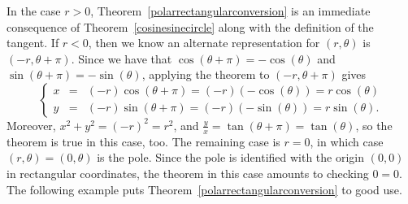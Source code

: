 In the case $r > 0$, Theorem~\ref{polarrectangularconversion} is an immediate consequence of Theorem~\ref{cosinesinecircle} along with the definition of the tangent. If $r < 0$, then we know an alternate representation for $(r,\theta)$ is $(-r, \theta + \pi)$. Since we have that  $\cos(\theta+\pi) = -\cos(\theta)$ and $\sin(\theta + \pi) = -\sin(\theta)$, applying the theorem to $(-r,\theta+\pi)$ gives 
$$
\left\{\begin{array}{rcl}
x &=& (-r) \cos(\theta + \pi) = (-r)(-\cos(\theta)) = r\cos(\theta)\\[0.2cm]
y& =& (-r) \sin(\theta + \pi) = (-r)(-\sin(\theta)) = r\sin(\theta).
\end{array}
\right.
$$
Moreover, $x^2 + y^2 = (-r)^2 = r^2$, and $\frac{y}{x} = \tan(\theta + \pi) = \tan(\theta)$, so the theorem is true in this case, too.  The remaining case is $r = 0$, in which case $(r,\theta) = (0,\theta)$ is the pole.  Since the pole is identified with the origin $(0,0)$ in rectangular coordinates, the theorem in this case amounts to checking $0=0$.  The following example puts Theorem~\ref{polarrectangularconversion} to good use.

